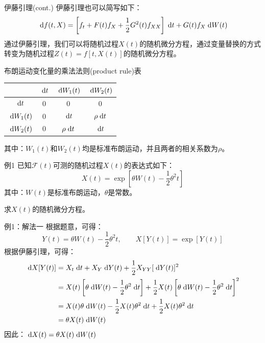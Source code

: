 \documentclass[t]{beamer}
\newcommand{\dif}{{\;\rm d}}
\begin{document}
\begin{frame}{伊藤引理(cont.)}
伊藤引理也可以简写如下：
\begin{equation*}
\dif f(t,X)=\left[f_t+F(t) f_X+\frac{1}{2}G^2(t) f_{XX}\right]\dif t+G(t) f_X \dif W(t)
\end{equation*}
通过伊藤引理，我们可以将随机过程$X(t)$的随机微分方程，通过变量替换的方式转变为随机过程$Z(t)=f[t,X(t)]$的随机微分方程。

\end{frame}

\begin{frame}{布朗运动变化量的乘法法则(product rule)表}
\begin{center}
\begin{tabular}{c|ccc}
\hline & $\dif t$& $\dif W_1(t)$ & $\dif W_2(t)$ \\
\hline
$\dif t$   &    0&0&0\\
$\dif W_1(t)$&0&$\dif t$&$\rho \dif t$\\
$\dif W_2(t)$&0&$\rho \dif t$&$\dif t$\\
\hline
\end{tabular}
\end{center}
其中：$W_1(t)$和$W_2(t)$均是标准布朗运动，并且两者的相关系数为$\rho$。
\end{frame}

\begin{frame}{例1}
已知$\mathcal{F}(t)$可测的随机过程$X(t)$的表达式如下：
\[X(t)=\exp\left[\theta W(t) -\frac{1}{2}\theta^2 t\right] \]
其中：$W(t)$是标准布朗运动，$\theta$是常数。

求$X(t)$的随机微分方程。
\end{frame}

\begin{frame}{例1：解法一}
    根据题意，可得：
    \[Y(t)=\theta W(t) -\frac{1}{2}\theta^2 t,\qquad X[Y(t)]=\exp[Y(t)] \]
    根据伊藤引理，可得：
    \[\begin{split}
    \dif X[Y(t)]&= X_t \dif t+X_Y \dif Y(t)+\frac{1}{2}X_{YY}[\dif Y(t)]^2\\
    &=X(t)\left[\theta \dif W(t) -\frac{1}{2}\theta^2 \dif t\right]+\frac{1}{2}X(t)\left[\theta \dif W(t) -\frac{1}{2}\theta^2 \dif t\right]^2\\
    &=X(t)\theta \dif W(t) -\frac{1}{2}X(t)\theta^2 \dif t+\frac{1}{2}X(t)\theta^2 \dif t\\
    &=\theta X(t)\dif W(t) 
    \end{split} \]
    因此：$\dif X(t)=\theta X(t)\dif W(t) $
\end{frame}
\end{document}

